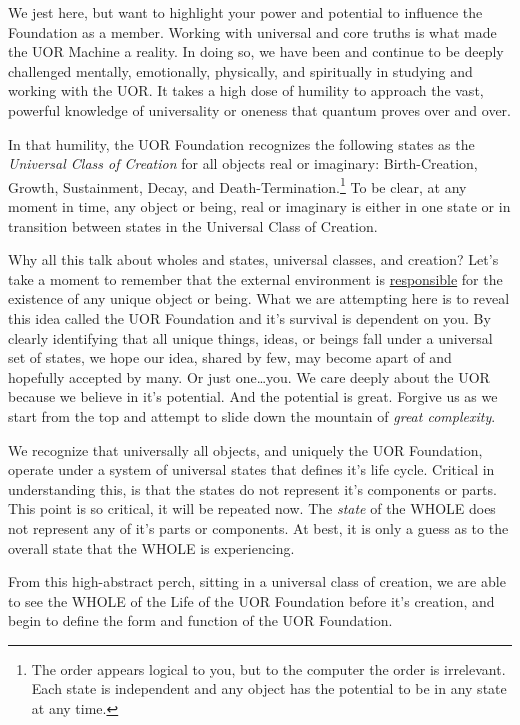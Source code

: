 \documentclass[twocolumn,10pt]{article}
\begin{document}
We jest here, but want to highlight your power and potential to influence the Foundation as a member.
Working with universal and core truths is what made the UOR Machine a reality.
In doing so, we have been and continue to be deeply challenged mentally, emotionally, physically, and spiritually in studying and working with the UOR\@.
It takes a high dose of humility to approach the vast, powerful knowledge of universality or oneness that quantum proves over and over.

In that humility, the UOR Foundation recognizes the following states as the \textit{Universal Class of Creation} for all objects real or imaginary:
Birth-Creation, Growth, Sustainment, Decay, and Death-Termination.\footnote{The order appears logical to you, but to the computer the order is irrelevant. Each state is independent and any object has the potential to be in any state at any time.}
To be clear, at any moment in time, any object or being, real or imaginary is either in one state or in transition between states in the Universal Class of Creation.

Why all this talk about wholes and states, universal classes, and creation?
Let's take a moment to remember that the external environment is \underline{responsible} for the existence of any unique object or being.
What we are attempting here is to reveal this idea called the UOR Foundation and it's survival is dependent on you.
By clearly identifying that all unique things, ideas, or beings fall under a universal set of states, we hope our idea, shared by few, may become apart of and hopefully accepted by many.
Or just one\ldots you.
We care deeply about the UOR because we believe in it's potential.
And the potential is great.
Forgive us as we start from the top and attempt to slide down the mountain of \textit{great complexity}.

We recognize that universally all objects,  and uniquely the UOR Foundation, operate under a system of universal states that defines it's life cycle.
Critical in understanding this, is that the states do not represent it's components or parts.
This point is so critical, it will be repeated now.
The \textit{state} of the WHOLE does not represent any of it's parts or components.
At best, it is only a guess as to the overall state that the WHOLE is experiencing.

From this high-abstract perch, sitting in a universal class of creation, we are able to see the WHOLE of the Life of the UOR Foundation before it's creation, and begin to define the form and function of the UOR Foundation.
\end{document}
